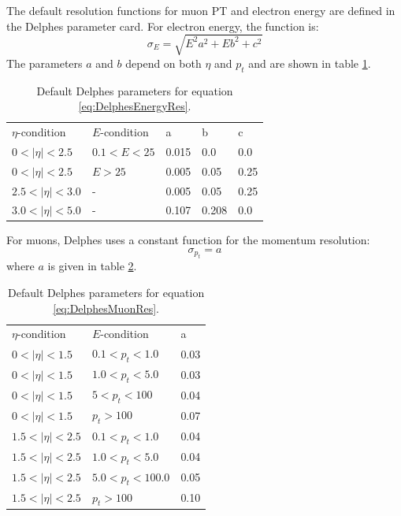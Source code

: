 \documentclass[10pt]{ucscthesisbs}
\begin{document}
The default resolution functions for muon PT and electron energy are defined in the Delphes parameter card. For electron energy, the function is:
\begin{equation} \label{eq:DelphesEnergyRes}
\sigma_E = \sqrt{E^2a^2 + Eb^2 + c^2}
\end{equation}
The parameters $a$ and $b$ depend on both $\eta$ and $p_t$ and are shown in table \ref{tab:DelphesEnergyRes}.

\begin{table}[]
\centering
\caption{Default Delphes parameters for equation \ref{eq:DelphesEnergyRes}.}
\label{tab:DelphesEnergyRes}
\begin{tabular}{lllll}
$\eta$-condition & $E$-condition  & a    & b   &c     \\
$0 < |\eta| < 2.5$ & $0.1 < E < 25$   & 0.015 & 0.0 & 0.0 \\
$0 < |\eta| < 2.5$ & $E > 25$ & 0.005 & 0.05 & 0.25\\
$2.5 < |\eta| < 3.0$ & - & 0.005 & 0.05 & 0.25\\
$3.0 < |\eta| < 5.0$ & - & 0.107  & 0.208  & 0.0
\end{tabular}
\end{table}

For muons, Delphes uses a constant function for the momentum resolution:
\begin{equation} \label{eq:DelphesMuonRes}
\sigma_{p_t} = a
\end{equation}
where $a$ is given in table \ref{tab:DelphesMuonRes}.

\begin{table}[]
\centering
\caption{Default Delphes parameters for equation \ref{eq:DelphesMuonRes}.}
\label{tab:DelphesMuonRes}
\begin{tabular}{lll}
$\eta$-condition & $E$-condition  & a     \\
$0 < |\eta| < 1.5$ & $0.1 < p_t < 1.0$   & 0.03\\
$0 < |\eta| < 1.5$ & $1.0 < p_t < 5.0$ & 0.03\\
$0 < |\eta| < 1.5$ & $5 < p_t < 100$ & 0.04\\
$0 < |\eta| < 1.5$ & $p_t > 100$ & 0.07\\
$1.5 < |\eta| < 2.5$ & $0.1 < p_t < 1.0$ & 0.04\\
$1.5 < |\eta| < 2.5$ & $1.0 < p_t < 5.0$ & 0.04\\
$1.5 < |\eta| < 2.5$ & $5.0 < p_t < 100.0$ & 0.05\\
$1.5 < |\eta| < 2.5$ & $p_t > 100$ & 0.10
\end{tabular}
\end{table}
\end{document}
